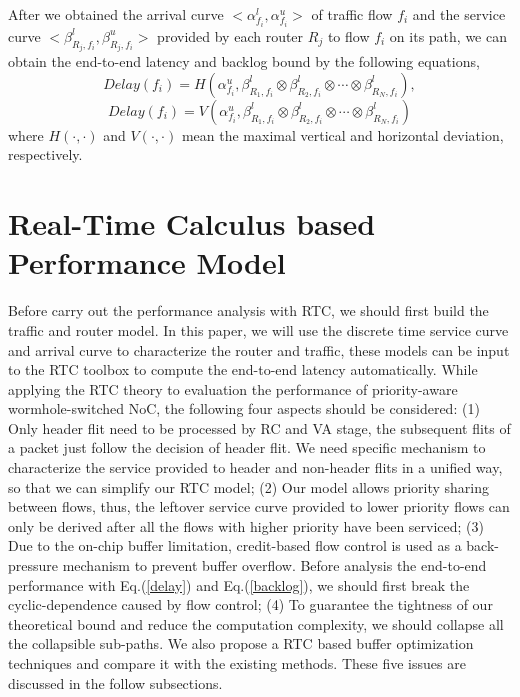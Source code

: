 \documentclass[10pt,journal]{IEEEtran}
\begin{document}
After we obtained the arrival curve $<\alpha^l_{f_i},\alpha^u_{f_i}>$ of traffic flow $f_i$ and the service curve $<\beta_{R_j,f_i}^l,\beta_{R_j,f_i}^u>$ provided by each router $R_j$ to flow $f_i$ on its path, we can obtain the end-to-end latency and backlog bound by the following equations,
\begin{equation}\label{delay}
Delay(f_i)=H(\alpha^u_{f_i},\beta^l_{R_1,f_i}\otimes\beta^l_{R_2,f_i}\otimes\cdots\otimes\beta^l_{R_N,f_i}),
\end{equation}
\begin{equation}\label{backlog}
Delay(f_i)=V(\alpha^u_{f_i},\beta^l_{R_1,f_i}\otimes\beta^l_{R_2,f_i}\otimes\cdots\otimes\beta^l_{R_N,f_i})
\end{equation}
where $H(\cdot,\cdot)$ and $V(\cdot,\cdot)$ mean the maximal vertical and horizontal deviation, respectively.

\section{Real-Time Calculus based Performance Model}\label{modeling}
Before carry out the performance analysis with RTC, we should first build the traffic and router model. In this paper, we will use the discrete time service curve and arrival curve to characterize the router and traffic, these models can be input to the RTC toolbox \cite{rtc} to compute the end-to-end latency automatically. While applying the RTC theory to evaluation the performance of priority-aware wormhole-switched NoC, the following four aspects should be considered: (1) Only header flit need to be processed by RC and VA stage, the subsequent flits of a packet just follow the decision of header flit. We need specific mechanism to characterize the service provided to header and non-header flits in a unified way, so that we can simplify our RTC model; (2) Our model allows priority sharing between flows, thus, the leftover service curve provided to lower priority flows can only be derived after all the flows with higher priority have been serviced; (3) Due to the on-chip buffer limitation, credit-based flow control is used as a back-pressure mechanism to prevent buffer overflow. Before analysis the end-to-end performance with Eq.(\ref{delay}) and Eq.(\ref{backlog}), we should first break the cyclic-dependence caused by flow control; (4) To guarantee the tightness of our theoretical bound and reduce the computation complexity, we should collapse all the collapsible sub-paths. We also propose a RTC based buffer optimization techniques and compare it with the existing methods. These five issues are discussed in the follow subsections.
\end{document}
